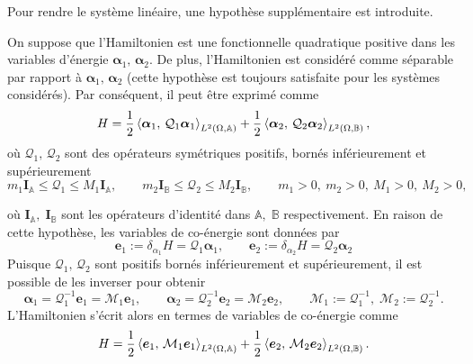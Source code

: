 Pour rendre le système linéaire, une hypothèse supplémentaire est introduite.
\begin{hypothese}\label{ass:quadHam_fr}
On suppose que l'Hamiltonien est une fonctionnelle quadratique positive dans les variables d'énergie $\bm{\alpha}_1, \, \bm{\alpha}_2 $. De plus, l'Hamiltonien est considéré comme séparable par rapport à $\bm{\alpha}_1, \, \bm{\alpha}_2 $ (cette hypothèse est toujours satisfaite pour les systèmes considérés). Par conséquent, il peut être exprimé comme
\begin{equation*}
H = \frac{1}{2} \inner[L^2(\Omega, \mathbb{A})]{\bm{\alpha}_{1}}{\mathcal{Q}_1\bm{\alpha}_{1}} + \frac{1}{2} \inner[L^2(\Omega, \mathbb{B})]{\bm{\alpha}_{2}}{\mathcal{Q}_2\bm{\alpha}_{2}},
\end{equation*}
où $ \mathcal{Q}_1, \, \mathcal{Q}_2 $ sont des opérateurs symétriques positifs, bornés inférieurement et supérieurement
\begin{equation*}
m_1 \bm{I}_\mathbb{A} \le\mathcal{Q}_1 \le M_1 \bm{I}_\mathbb{A}, \qquad  m_2 \bm{I}_\mathbb{B} \le \mathcal{Q}_2 \le M_2 \bm{I}_\mathbb{B}, \qquad m_1>0, \ m_2>0, \ M_1>0, \ M_2>0,
\end{equation*} 
\end{hypothese}
où $\bm{I}_\mathbb{A}, \; \bm{I}_\mathbb{B}$ sont les opérateurs d'identité dans $\mathbb{A}, \; \mathbb{B}$ respectivement. En raison de cette hypothèse, les variables de co-énergie sont données par
\begin{equation*}
\bm{e}_1 := \delta_{\alpha_1} H = \mathcal{Q}_1 \bm{\alpha}_1, \qquad \bm{e}_2 := \delta_{\alpha_2} H = \mathcal{Q}_2 \bm{\alpha}_2
\end{equation*}
Puisque $\mathcal{Q}_1, \, \mathcal{Q}_2 $ sont positifs bornés inférieurement et supérieurement, il est possible de les inverser pour obtenir
\begin{equation*}
\bm{\alpha}_1 = \mathcal{Q}_1^{-1}\bm{e}_1 = \mathcal{M}_1\bm{e}_1, \qquad  \bm{\alpha}_2 = \mathcal{Q}_2^{-1} \bm{e}_2 = \mathcal{M}_2 \bm{e}_2, \qquad \mathcal{M}_1 := \mathcal{Q}_1^{-1}, \; \mathcal{M}_2 := \mathcal{Q}_2^{-1}.
\end{equation*}
L'Hamiltonien s'écrit alors en termes de variables de co-énergie comme
\begin{equation*}
H = \frac{1}{2} \inner[L^2(\Omega, \mathbb{A})]{\bm{e}_{1}}{\mathcal{M}_1\bm{e}_{1}} + \frac{1}{2} \inner[L^2(\Omega, \mathbb{B})]{\bm{e}_{2}}{\mathcal{M}_2\bm{e}_{2}}.
\end{equation*}

